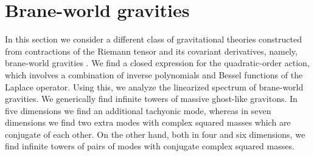 \documentclass[11pt]{article}
\newcommand{\comment}[1]{{\bf [[[#1]]]}}
\begin{document}
{\section{Brane-world gravities}\label{bW}
In this section we consider a different class of  gravitational theories constructed from contractions of the Riemann tensor and its covariant derivatives, namely, brane-world gravities \cite{Randall:1999vf}. We find a closed expression for the quadratic-order action, which involves a combination of inverse polynomials and Bessel functions of the Laplace operator. Using this, we analyze the linearized spectrum of brane-world gravities. 
We generically find infinite towers of massive ghost-like gravitons. In five dimensions we find an additional tachyonic mode, whereas in seven dimensions we find two extra modes with complex squared masses which are conjugate of each other.  On the other hand, both in four and six dimensions, we find infinite towers of pairs of modes with conjugate complex squared masses.    %


}
\end{document}
